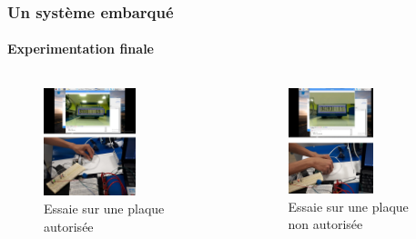 \begin{frame}
\frametitle{Un système embarqué}
\framesubtitle{Experimentation finale}

\begin{columns}
    \begin{column}{6cm}
        \begin{figure}
            \includegraphics[width=0.6\textwidth]{figures/Autorise.jpg}\caption{Essaie sur une plaque autorisée}
        \end{figure}
    \end{column}
    \begin{column}{6cm}
        \begin{figure}
            \includegraphics[width=0.6\textwidth]{figures/Refuse.jpg}\caption{Essaie sur une plaque non autorisée}
        \end{figure}
    \end{column}
\end{columns}
\end{frame}


